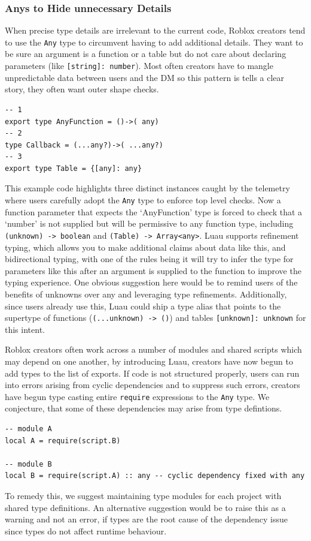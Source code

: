 \documentclass[acmsmall,screen,review,anonymous]{acmart}
\newcommand{\code}[1]{\texttt{#1}}
\newcommand{\Any}{\code{Any}}
\begin{document}
\subsubsection{Anys to Hide unnecessary Details}
\label{s:approach:3}
When precise type details are irrelevant to the current code, 
Roblox creators tend to use the \Any{} type to circumvent having 
to add additional details. They want to 
be sure an argument is a function or a table but do not care about 
declaring parameters (like \code{{[string]: number}}). Most often creators 
have to mangle unpredictable data between users and the DM so this pattern is 
tells a clear story, they often want outer shape checks. \\
\begin{verbatim}
-- 1
export type AnyFunction = ()->( any)
-- 2
type Callback = (...any?)->( ...any?)
-- 3
export type Table = {[any]: any}
\end{verbatim}
This example code highlights three distinct instances caught by the telemetry
where users carefully adopt the \Any{} type to enforce top level checks. 
Now a function parameter that expects the `AnyFunction' type is forced to check that
a `number' is not supplied but will be permissive to any function type, including
\code{(unknown) -> boolean} and \code{(Table) -> Array<any>}.
Luau supports refinement typing, which allows you to make additional claims about 
data like this, and bidirectional typing, with one of the rules being it will try to 
infer the type for parameters like this after an argument is supplied to the function
to improve the typing experience. One obvious suggestion here would be to remind users
of the benefits of unknowns over any and leveraging type refinements. Additionally,
since users already use this, Luau could ship a type alias that points to the 
supertype of functions (\code{(...unknown) -> ()}) and tables \code{[unknown]: unknown} 
for this intent.



\label{s:approach:4}
Roblox creators often work across a number of modules and shared scripts which may 
depend on one another, by introducing Luau, creators have now begun to add types to 
the list of exports. If code is not structured properly, users can run into errors 
arising from cyclic dependencies and to suppress such errors, creators have begun type 
casting entire \code{require} expressions to the \Any{} type. We conjecture, that some 
of these dependencies may arise from type defintions. \\
\begin{verbatim}
-- module A
local A = require(script.B)

-- module B
local B = require(script.A) :: any -- cyclic dependency fixed with any
\end{verbatim} 
To remedy this, we suggest maintaining type modules for each project with shared type 
definitions. An alternative suggestion would be to raise this as a warning and not an 
error, if types are the root cause of the dependency issue since types do not affect 
runtime behaviour.
\end{document}
